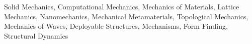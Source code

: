 {Solid Mechanics, Computational Mechanics, Mechanics of Materials, Lattice Mechanics, Nanomechanics, Mechanical Metamaterials, Topological Mechanics, Mechanics of Waves, Deployable Structures, Mechanisms, Form Finding, Structural Dynamics}%